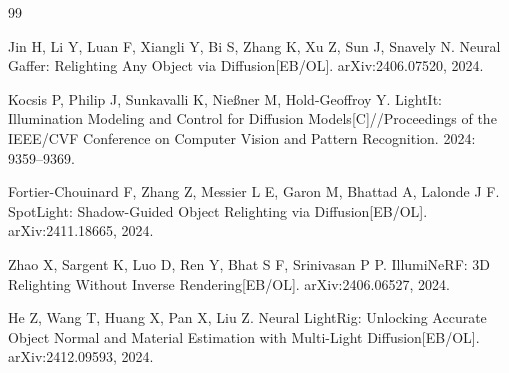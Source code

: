 \documentclass[UTF8,a4paper]{ctexart}
\begin{document}
\begin{thebibliography}{99}

Jin H, Li Y, Luan F, Xiangli Y, Bi S, Zhang K, Xu Z, Sun J, Snavely N. Neural Gaffer: Relighting Any Object via Diffusion[EB/OL]. arXiv:2406.07520, 2024.

Kocsis P, Philip J, Sunkavalli K, Nie{\ss}ner M, Hold-Geoffroy Y. LightIt: Illumination Modeling and Control for Diffusion Models[C]//Proceedings of the IEEE/CVF Conference on Computer Vision and Pattern Recognition. 2024: 9359--9369.

Fortier-Chouinard F, Zhang Z, Messier L E, Garon M, Bhattad A, Lalonde J F. SpotLight: Shadow-Guided Object Relighting via Diffusion[EB/OL]. arXiv:2411.18665, 2024.

Zhao X, Sargent K, Luo D, Ren Y, Bhat S F, Srinivasan P P. IllumiNeRF: 3D Relighting Without Inverse Rendering[EB/OL]. arXiv:2406.06527, 2024.

He Z, Wang T, Huang X, Pan X, Liu Z. Neural LightRig: Unlocking Accurate Object Normal and Material Estimation with Multi-Light Diffusion[EB/OL]. arXiv:2412.09593, 2024.

\end{thebibliography}
\end{document}
